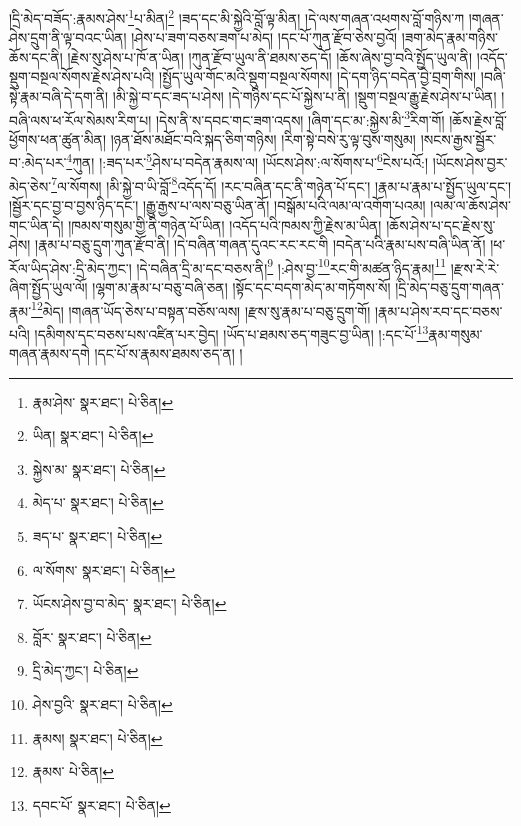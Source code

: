 །དྲི་མེད་བཟོད་:རྣམས་ཤེས་\footnote{རྣམ་ཤེས་  སྣར་ཐང་།  པེ་ཅིན། }པ་མིན།\footnote{ཡིན།  སྣར་ཐང་།  པེ་ཅིན། } །ཟད་དང་མི་སྐྱེའི་བློ་ལྟ་མིན། །དེ་ལས་གཞན་འཕགས་བློ་གཉིས་ཀ །གཞན་ཤེས་དྲུག་ནི་ལྟ་བའང་ཡིན། །ཤེས་པ་ཟག་བཅས་ཟག་པ་མེད། །དང་པོ་ཀུན་རྫོབ་ཅེས་བྱའོ། །ཟག་མེད་རྣམ་གཉིས་ཆོས་དང་ནི། །རྗེས་སུ་ཤེས་པ་ཁོ་ན་ཡིན། །ཀུན་རྫོབ་ཡུལ་ནི་ཐམས་ཅད་དོ། །ཆོས་ཞེས་བྱ་བའི་སྤྱོད་ཡུལ་ནི། །འདོད་སྡུག་བསྔལ་སོགས་རྗེས་ཤེས་པའི། །སྤྱོད་ཡུལ་གོང་མའི་སྡུག་བསྔལ་སོགས། །དེ་དག་ཉིད་བདེན་བྱེ་བྲག་གིས། །བཞི་སྟེ་རྣམ་བཞི་དེ་དག་ནི། །མི་སྐྱེ་བ་དང་ཟད་པ་ཤེས། །དེ་གཉིས་དང་པོ་སྐྱེས་པ་ནི། །སྡུག་བསྔལ་རྒྱུ་རྗེས་ཤེས་པ་ཡིན། །བཞི་ལས་ཕ་རོལ་སེམས་རིག་པ། །དེས་ནི་ས་དབང་གང་ཟག་འདས། །ཞིག་དང་མ་:སྐྱེས་མི་\footnote{སྐྱེས་མ་  སྣར་ཐང་།  པེ་ཅིན། }རིག་གོ། །ཆོས་རྗེས་བློ་ཕྱོགས་ཕན་ཚུན་མིན། །ཉན་ཐོས་མཐོང་བའི་སྐད་ཅིག་གཉིས། །རིག་སྟེ་བསེ་རུ་ལྟ་བུས་གསུམ། །སངས་རྒྱས་སྦྱོར་བ་:མེད་པར་\footnote{མེད་པ་  སྣར་ཐང་།  པེ་ཅིན། }ཀུན། །:ཟད་པར་\footnote{ཟད་པ་  སྣར་ཐང་།  པེ་ཅིན། }ཤེས་པ་བདེན་རྣམས་ལ། །ཡོངས་ཤེས་:ལ་སོགས་པ་\footnote{ལ་སོགས་  སྣར་ཐང་།  པེ་ཅིན། }ངེས་པའོ:། །ཡོངས་ཤེས་བྱར་མེད་ཅེས་\footnote{ཡོངས་ཤེས་བྱ་བ་མེད་  སྣར་ཐང་།  པེ་ཅིན། }ལ་སོགས། །མི་སྐྱེ་བ་ཡི་བློ་\footnote{བློར་  སྣར་ཐང་།  པེ་ཅིན། }འདོད་དོ། །རང་བཞིན་དང་ནི་གཉེན་པོ་དང་། །རྣམ་པ་རྣམ་པ་སྤྱོད་ཡུལ་དང་། །སྦྱོར་དང་བྱ་བ་བྱས་ཉིད་དང་། །རྒྱུ་རྒྱས་པ་ལས་བཅུ་ཡིན་ནོ། །བསྒོམ་པའི་ལམ་ལ་འགོག་པའམ། །ལམ་ལ་ཆོས་ཤེས་གང་ཡིན་དེ། །ཁམས་གསུམ་གྱི་ནི་གཉེན་པོ་ཡིན། །འདོད་པའི་ཁམས་ཀྱི་རྗེས་མ་ཡིན། །ཆོས་ཤེས་པ་དང་རྗེས་སུ་ཤེས། །རྣམ་པ་བཅུ་དྲུག་ཀུན་རྫོབ་ནི། །དེ་བཞིན་གཞན་དུའང་རང་རང་གི །བདེན་པའི་རྣམ་པས་བཞི་ཡིན་ནོ། །ཕ་རོལ་ཡིད་ཤེས་:དྲི་མེད་ཀྱང་། །དེ་བཞིན་དྲི་མ་དང་བཅས་ནི།\footnote{དྲི་མེད་ཀྱང་།  པེ་ཅིན། } །:ཤེས་བྱ་\footnote{ཤེས་བྱའི་  སྣར་ཐང་།  པེ་ཅིན། }རང་གི་མཚན་ཉིད་རྣམ།\footnote{རྣམས།  སྣར་ཐང་།  པེ་ཅིན། } །རྫས་རེ་རེ་ཞིག་སྤྱོད་ཡུལ་ལོ། །ལྷག་མ་རྣམ་པ་བཅུ་བཞི་ཅན། །སྟོང་དང་བདག་མེད་མ་གཏོགས་སོ། །དྲི་མེད་བཅུ་དྲུག་གཞན་རྣམ་\footnote{རྣམས་  པེ་ཅིན། }མེད། །གཞན་ཡོད་ཅེས་པ་བསྟན་བཅོས་ལས། །རྫས་སུ་རྣམ་པ་བཅུ་དྲུག་གོ། །རྣམ་པ་ཤེས་རབ་དང་བཅས་པའི། །དམིགས་དང་བཅས་པས་འཛིན་པར་བྱེད། །ཡོད་པ་ཐམས་ཅད་གཟུང་བྱ་ཡིན། །:དང་པོ་\footnote{དབང་པོ་  སྣར་ཐང་།  པེ་ཅིན། }རྣམ་གསུམ་གཞན་རྣམས་དགེ །དང་པོ་ས་རྣམས་ཐམས་ཅད་ན། །
